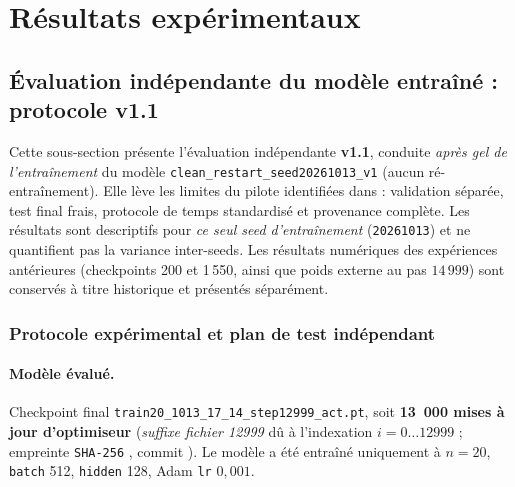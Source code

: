 \documentclass[12pt, a4paper, twoside, openright]{book}
\begin{document}
\section{Résultats expérimentaux}
\label{sec:ch4-resultats}


\subsection{Évaluation indépendante du modèle entraîné : protocole v1.1}
\label{sec:eval-v1-1}

Cette sous-section présente l'évaluation indépendante \textbf{v1.1}, conduite \emph{après gel de l'entraînement} du modèle \texttt{clean\_restart\_seed20261013\_v1} (aucun ré-entraînement). Elle lève les limites du pilote identifiées dans  : validation séparée, test final frais, protocole de temps standardisé et provenance complète. Les résultats sont descriptifs pour \emph{ce seul seed d'entraînement} (\texttt{20261013}) et ne quantifient pas la variance inter-seeds. Les résultats numériques des expériences antérieures (checkpoints 200 et 1\,550, ainsi que poids externe au pas $14\,999$) sont conservés à titre historique et présentés séparément.

\subsubsection{Protocole expérimental et plan de test indépendant}
\label{sec:eval-v1-1-protocole}

\paragraph{Modèle évalué.} Checkpoint final \texttt{train20\_1013\_17\_14\_step12999\_act.pt}, soit \textbf{13~000 mises à jour d'optimiseur} (\emph{suffixe fichier 12999} dû à l'indexation $i=0\ldots12999$ ; empreinte \texttt{SHA-256} , commit ). Le modèle a été entraîné uniquement à $n=20$, \texttt{batch} 512, \texttt{hidden} 128, Adam \texttt{lr} $0{,}001$.
\end{document}
